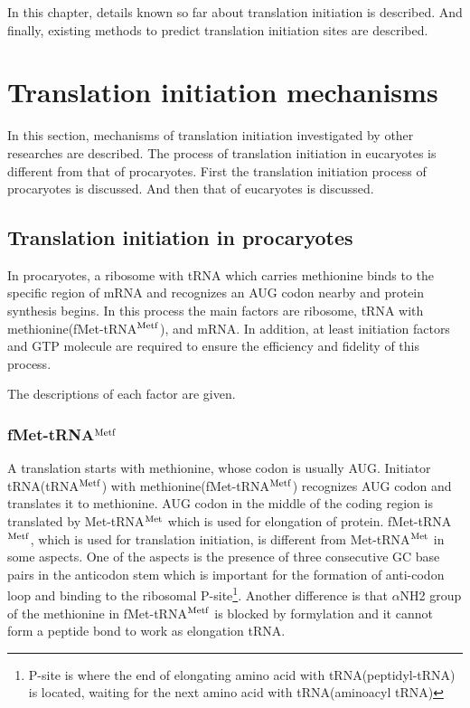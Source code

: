 
In this chapter, details known so far about translation initiation is
described. And finally, existing methods to predict translation
initiation sites are described.

\section{Translation initiation mechanisms}

In this section, mechanisms of translation initiation investigated by
other researches are described.  The process of translation initiation
in eucaryotes is different from that of procaryotes.  First
the translation initiation process of procaryotes is discussed. And then
that of eucaryotes is discussed.

\subsection{Translation initiation in procaryotes}

In procaryotes, a ribosome with tRNA which carries methionine binds to
the specific region of mRNA and recognizes an AUG codon nearby and
protein synthesis begins. In this process the main factors are
ribosome, tRNA with methionine(fMet-tRNA$^{\rm Metf}$), and mRNA. In
addition, at least initiation factors and GTP molecule are required to
ensure the efficiency and fidelity of this process.

The descriptions of each factor are given\cite{label20}.

\subsubsection{fMet-tRNA$^{\rm Metf}$}
A translation starts with methionine, whose codon is usually AUG.
Initiator tRNA(tRNA$^{\rm Metf}$) with methionine(fMet-tRNA$^{\rm
Metf}$) recognizes AUG codon and translates it to methionine.  AUG
codon in the middle of the coding region is translated by
Met-tRNA$^{\rm Met}$ which is used for elongation of
protein. fMet-tRNA$^{\rm Metf}$, which is used for translation
initiation, is different from Met-tRNA$^{\rm Met}$ in some aspects.
One of the aspects is the presence of three consecutive GC base pairs in the
anticodon stem which is important for the formation of anti-codon loop
and binding to the ribosomal P-site\footnote{P-site is where the end
of elongating amino acid with tRNA(peptidyl-tRNA) is located, waiting
for the next amino acid with tRNA(aminoacyl tRNA)}.  Another
difference is that \(\alpha\)NH2 group of the methionine in
fMet-tRNA$^{\rm Metf}$ is blocked by formylation and it cannot form a
peptide bond to work as elongation tRNA.

